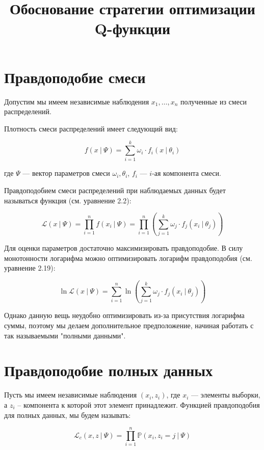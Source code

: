\documentclass[14pt, a4paper, oneside]{memoir}
\title{Обоснование стратегии оптимизации Q-функции}
\begin{document}
\begin{titlingpage}
	\maketitle
\end{titlingpage}

\section{Правдоподобие смеси}

Допустим мы имеем независимые наблюдения $x_1, \dots, x_n$ полученные из смеси распределений.

Плотность смеси распределений имеет следующий вид:

\[f(x ~|~ \Psi) = \sum_{i=1}^k \omega_i \cdot f_i (x~|~\theta_i)\]

где $\Psi$ --- вектор параметров смеси $\omega_i, \theta_i$, $f_i$ --- $i$-ая компонента смеси.

Правдоподобием смеси распределений при наблюдаемых данных будет называться функция \cite{mclachlan2000finite}{ (см. уравнение 2.2)}:

\[\mathcal{L}(x ~|~ \Psi) = \prod_{i=1}^n f(x_i ~|~ \Psi) = \prod_{i=1}^n \left(\sum_{j=1}^k \omega_j \cdot f_j(x_i ~|~ \theta_j)\right)\]

Для оценки параметров достаточно максимизировать правдоподобие. В силу монотонности логарифма можно оптимизировать логарифм правдоподобия \cite{mclachlan2000finite}{ (см. уравнение 2.19)}:

\[\ln \mathcal{L}(x ~|~ \Psi) = \sum_{i=1}^n \ln \left(\sum_{j=1}^k \omega_j \cdot f_j(x_i~|~ \theta_j)\right)\]


Однако данную вещь неудобно оптимизировать из-за присутствия логарифма суммы, поэтому мы делаем дополнительное предположение, начиная работать с так называемыми "полными данными".

\section{Правдоподобие полных данных}

Пусть мы имеем независимые наблюдения $(x_i, z_i)$, где $x_i$ --- элементы выборки, а $z_i$ -- компонента к которой этот элемент принадлежит.
Функцией правдоподобия для полных данных, мы будем называть:

\[\mathcal{L}_c(x, z ~|~ \Psi) = \prod_{i=1}^n \mathbb{P} (x_i, z_i = j~|~ \Psi)\]
\end{document}

